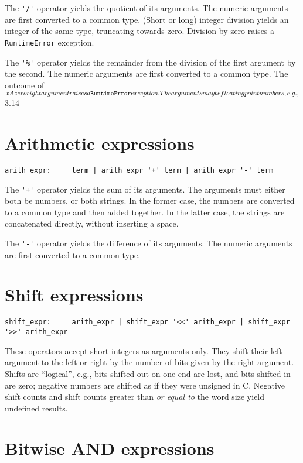 The \verb|'/'| operator yields the quotient of its arguments.
The numeric arguments are first converted to a common type.
(Short or long) integer division yields an integer of the same type,
truncating towards zero.
Division by zero raises a {\tt RuntimeError} exception.

The \verb|'%'| operator yields the remainder from the division
of the first argument by the second.
The numeric arguments are first converted to a common type.
The outcome of $x %
A zero right argument raises a {\tt RuntimeError} exception.
The arguments may be floating point numbers, e.g.,
$3.14 %

\section{Arithmetic expressions}

\begin{verbatim}
arith_expr:     term | arith_expr '+' term | arith_expr '-' term
\end{verbatim}

The \verb|'+'| operator yields the sum of its arguments.
The arguments must either both be numbers, or both strings.
In the former case, the numbers are converted to a common type
and then added together.
In the latter case, the strings are concatenated directly,
without inserting a space.

The \verb|'-'| operator yields the difference of its arguments.
The numeric arguments are first converted to a common type.

\section{Shift expressions}

\begin{verbatim}
shift_expr:     arith_expr | shift_expr '<<' arith_expr | shift_expr '>>' arith_expr
\end{verbatim}

These operators accept short integers as arguments only.
They shift their left argument to the left or right by the number of bits
given by the right argument.  Shifts are ``logical'', e.g., bits shifted
out on one end are lost, and bits shifted in are zero;
negative numbers are shifted as if they were unsigned in C.
Negative shift counts and shift counts greater than {\em or equal to}
the word size yield undefined results.

\section{Bitwise AND expressions}

